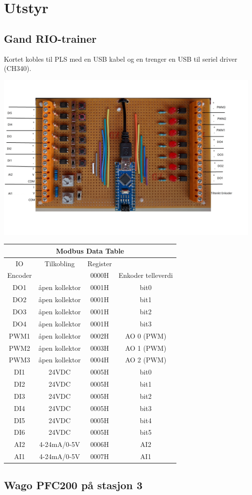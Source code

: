 
\section{Utstyr}
\subsection{Gand RIO-trainer}

Kortet kobles til PLS med en USB kabel og en trenger en USB til seriel
driver (CH340). 

\includegraphics[width=1\textwidth]{./GandRioTrainer.jpg}
\small
\begin{tabular}{|c|c|c|c|}
\hline 
\multicolumn{4}{|c|}{Modbus Data Table}\tabularnewline
\hline 
\hline 
IO & Tilkobling & Register & \tabularnewline
\hline 
Encoder &  & 0000H & Enkoder telleverdi\tabularnewline
\hline 
DO1 & åpen kollektor & 0001H & bit0\tabularnewline
\hline 
DO2 & åpen kollektor & 0001H & bit1\tabularnewline
\hline 
DO3 & åpen kollektor & 0001H & bit2\tabularnewline
\hline 
DO4 & åpen kollektor & 0001H & bit3\tabularnewline
\hline 
PWM1 & åpen kollektor & 0002H & AO 0 (PWM)\tabularnewline
\hline 
PWM2 & åpen kollektor & 0003H & AO 1 (PWM)\tabularnewline
\hline 
PWM3 & åpen kollektor & 0004H & AO 2 (PWM)\tabularnewline
\hline 
DI1 & 24VDC & 0005H & bit0\tabularnewline
\hline 
DI2 & 24VDC & 0005H & bit1\tabularnewline
\hline 
DI3 & 24VDC & 0005H & bit2\tabularnewline
\hline 
DI4 & 24VDC & 0005H & bit3\tabularnewline
\hline 
DI5 & 24VDC & 0005H & bit4\tabularnewline
\hline 
DI6 & 24VDC & 0005H & bit5\tabularnewline
\hline 
AI2 & 4-24mA/0-5V & 0006H & AI2\tabularnewline
\hline 
AI1 & 4-24mA/0-5V & 0007H & AI1\tabularnewline
\hline 
\end{tabular}
\normalsize
\vfil \eject
\subsection{Wago PFC200 på stasjon 3}

